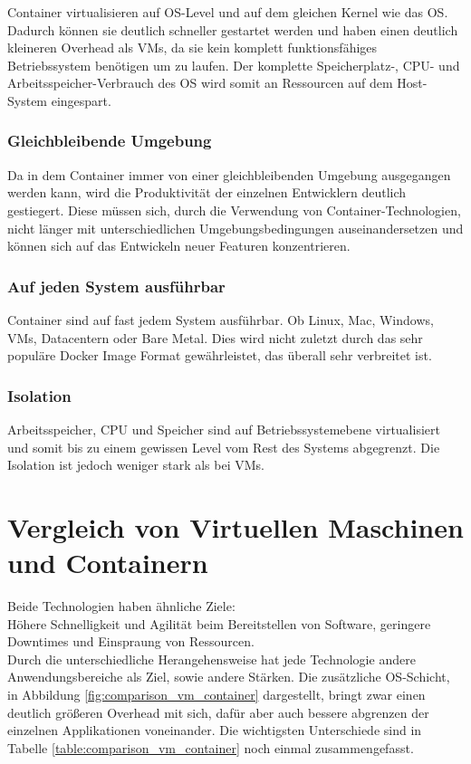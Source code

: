 Container virtualisieren auf \ac{OS}-Level und auf dem gleichen Kernel wie das \ac{OS}.
Dadurch können sie deutlich schneller gestartet werden und haben einen deutlich kleineren Overhead als \ac{VM}s, da sie kein komplett funktionsfähiges Betriebssystem benötigen um zu laufen.
Der komplette Speicherplatz-, CPU- und Arbeitsspeicher-Verbrauch des \ac{OS} wird somit an Ressourcen auf dem Host-System eingespart.

\subsubsection{Gleichbleibende Umgebung}
Da in dem Container immer von einer gleichbleibenden Umgebung ausgegangen werden kann, wird die Produktivität der einzelnen Entwicklern deutlich gestiegert.
Diese müssen sich, durch die Verwendung von Container-Technologien, nicht länger mit unterschiedlichen Umgebungsbedingungen auseinandersetzen und können sich auf das Entwickeln neuer Featuren konzentrieren.

\subsubsection{Auf jeden System ausführbar}
Container sind auf fast jedem System ausführbar. 
Ob Linux, Mac, Windows, \ac{VM}s, Datacentern oder Bare Metal.
Dies wird nicht zuletzt durch das sehr populäre Docker Image Format gewährleistet, das überall sehr verbreitet ist. 

\subsubsection{Isolation}
Arbeitsspeicher, CPU und Speicher sind auf Betriebssystemebene virtualisiert und somit bis zu einem gewissen Level vom Rest des Systems abgegrenzt. 
Die Isolation ist jedoch weniger stark als bei \ac{VM}s.



\section{Vergleich von Virtuellen Maschinen und Containern}

Beide Technologien haben ähnliche Ziele: \\
Höhere Schnelligkeit und Agilität beim Bereitstellen von Software, geringere Downtimes und Einspraung von Ressourcen. \\
Durch die unterschiedliche Herangehensweise hat jede Technologie andere Anwendungsbereiche als Ziel, sowie andere Stärken.
Die zusätzliche \ac{OS}-Schicht, in Abbildung \ref{fig:comparison_vm_container} dargestellt, bringt zwar einen deutlich größeren Overhead mit sich, dafür aber auch bessere abgrenzen der einzelnen Applikationen voneinander.
Die wichtigsten Unterschiede sind in Tabelle \ref{table:comparison_vm_container} noch einmal zusammengefasst. 

